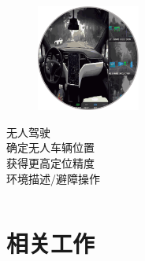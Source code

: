 \documentclass[aspectratio=169,12pt]{beamer}
\begin{document}
\begin{frame}[t]
\begin{columns}
		\begin{column}{.30\linewidth}
			\begin{figure}
				\includegraphics[height=3.5cm]{5.png}
			\end{figure}
			\begin{center}
				无人驾驶\\[0.5em]
				{\small 确定无人车辆位置\\
				获得更高定位精度\\
				环境描述/避障操作\\}
			\end{center}
		\end{column}
	\end{columns}
	
\end{frame}

\section{相关工作}
\end{document}
